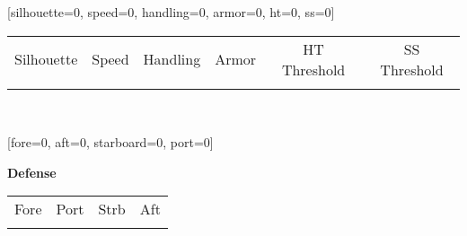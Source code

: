 \newkeycommand{\vehiclestats}[silhouette=0, speed=0, handling=0, armor=0, ht=0, ss=0]{
	\begin{center}
		\begin{tabular}{ |c|c|c| | c | c | c | } \hline
			\tiny Silhouette &
			\tiny Speed &
			\tiny Handling &
			\tiny Armor &
			\tiny HT Threshold &
			\tiny SS Threshold \\[0.25em]
			\textbf{\commandkey{silhouette}} &
			\textbf{\commandkey{speed}} &
			\textbf{\commandkey{handling}} &
			\textbf{\commandkey{armor}} &
			\textbf{\commandkey{ht}} &
			\textbf{\commandkey{ss}} \\ \hline
		\end{tabular}
		\\[1em]
	\end{center}	
}
\newkeycommand{\vehicledefense}[fore=0, aft=0, starboard=0, port=0]{
	\begin{center}
		\footnotesize \textbf{Defense} \\
		\begin{tabular}{ |c|c|c|c| } \hline
			\tiny Fore &
			\tiny Port &
			\tiny Strb &
			\tiny Aft \\[0.25em]
			\textbf{\commandkey{fore}} &
			\textbf{\commandkey{port}} &
			\textbf{\commandkey{starboard}} &
			\textbf{\commandkey{port}} \\ \hline
		\end{tabular}
		\\[1em]
	\end{center}
}


